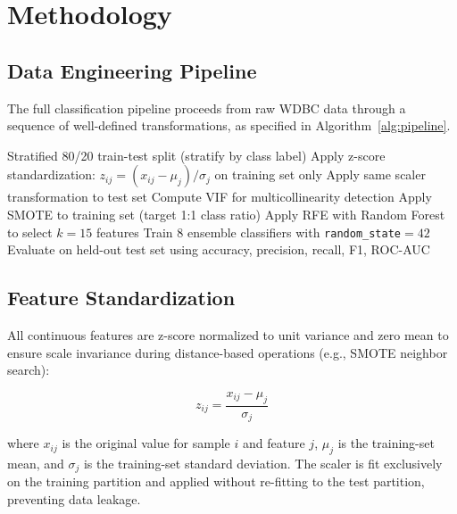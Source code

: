 \documentclass[10pt,letterpaper]{article}
\begin{document}
\section{Methodology}

\subsection{Data Engineering Pipeline}

The full classification pipeline proceeds from raw WDBC data through a sequence of well-defined
transformations, as specified in Algorithm~\ref{alg:pipeline}.

\begin{algorithm}[h]
\caption{Breast Cancer Classification Pipeline}
\label{alg:pipeline}
Stratified 80/20 train-test split (stratify by class label)\;
Apply z-score standardization: $z_{ij} = (x_{ij} - \mu_j)/\sigma_j$ on training set only\;
Apply same scaler transformation to test set\;
Compute VIF for multicollinearity detection\;
Apply SMOTE to training set (target 1:1 class ratio)\;
Apply RFE with Random Forest to select $k=15$ features\;
Train 8 ensemble classifiers with \texttt{random\_state}$=42$\;
Evaluate on held-out test set using accuracy, precision, recall, F1, ROC-AUC\;
\end{algorithm}

\subsection{Feature Standardization}

All continuous features are z-score normalized to unit variance and zero mean to ensure scale
invariance during distance-based operations (e.g., SMOTE neighbor search):

\begin{equation}
    z_{ij} = \frac{x_{ij} - \mu_j}{\sigma_j}
    \label{eq:zscore}
\end{equation}

where $x_{ij}$ is the original value for sample $i$ and feature $j$, $\mu_j$ is the training-set
mean, and $\sigma_j$ is the training-set standard deviation. The scaler is fit exclusively on the
training partition and applied without re-fitting to the test partition, preventing data leakage.
\end{document}
